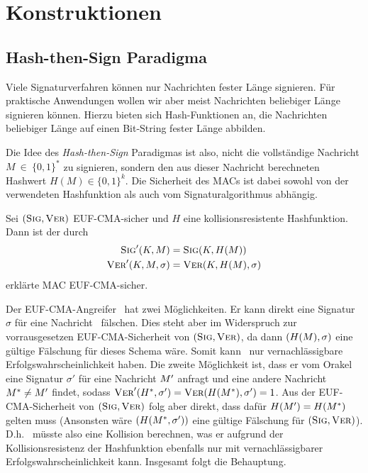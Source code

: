 \section{Konstruktionen}

\subsection{Hash-then-Sign Paradigma} 
Viele Signaturverfahren können nur Nachrichten fester Länge
signieren. Für praktische Anwendungen wollen wir aber meist Nachrichten
beliebiger Länge signieren können. Hierzu bieten sich Hash-Funktionen an, die
Nachrichten beliebiger Länge auf einen Bit-String fester Länge abbilden.

Die Idee des \emph{Hash-then-Sign} Paradigmas ist also, nicht die
vollständige Nachricht $M~\in~\{0,1\}^*$ zu signieren, sondern den aus
dieser Nachricht berechneten Hashwert $H(M) \in \{0,1\}^k$. Die
Sicherheit des MACs ist dabei sowohl von der verwendeten Hashfunktion
als auch vom Signaturalgorithmus abhängig.~\\

\begin{theorem} Sei $(\textsc{Sig}, \textsc{Ver})$ EUF-CMA-sicher und $H$ eine
  kollisionsresistente Hashfunktion. Dann ist der durch
  \begin{align*} 
    \textsc{Sig}'(K,M) &= \textsc{Sig}(K,H(M))\\ 
    \textsc{Ver}'(K,M,\sigma) &= \textsc{Ver}(K,H(M),\sigma)
  \end{align*} erklärte MAC EUF-CMA-sicher.~\\
\end{theorem}

\begin{beweisidee}
  \label{ch:symauth:eufcma-beweis}
Der  EUF-CMA-Angreifer \A~hat zwei Möglichkeiten. Er kann direkt eine
Signatur $\sigma$ für eine Nachricht \plaint~fälschen. Dies steht aber
im Widerspruch zur vorrausgesetzen EUF-CMA-Sicherheit von $(\textsc{Sig},
\textsc{Ver})$, da dann $(H(M), \sigma)$ eine gültige Fälschung für dieses
Schema wäre. Somit kann \A~nur vernachlässigbare
Erfolgswahrscheinlichkeit haben. Die zweite Möglichkeit ist, dass er vom
Orakel eine Signatur $\sigma'$ für eine Nachricht $M'$ anfragt und
eine andere Nachricht $M^* \neq M'$ findet, sodass
$\textsc{Ver}'(H^*, \sigma') = \textsc{Ver}(H(M^*), \sigma') = 1$. Aus der
EUF-CMA-Sicherheit von $(\textsc{Sig},\textsc{Ver})$ folg aber direkt, dass dafür
$H(M') = H(M^*)$ gelten muss (Ansonsten wäre $(H(M^*,
\sigma'))$ eine gültige Fälschung für $(\textsc{Sig}, \textsc{Ver})$). D.h. \A~müsste
also eine Kollision berechnen, was er aufgrund der Kollisionsresistenz
der Hashfunktion ebenfalls nur mit vernachlässigbarer
Erfolgswahrscheinlichkeit kann. Insgesamt folgt die Behauptung.
\end{beweisidee}

